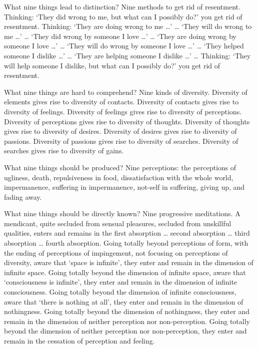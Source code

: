 \documentclass[12pt,openany]{book}%
\begin{document}
What nine things lead to distinction? Nine methods to get rid of resentment. Thinking: ‘They did wrong to me, but what can I possibly do?’ you get rid of resentment. Thinking: ‘They are doing wrong to me …’ … ‘They will do wrong to me …’ … ‘They did wrong by someone I love …’ … ‘They are doing wrong by someone I love …’ … ‘They will do wrong by someone I love …’ … ‘They helped someone I dislike …’ … ‘They are helping someone I dislike …’ … Thinking: ‘They will help someone I dislike, but what can I possibly do?’ you get rid of resentment. 

What nine things are hard to comprehend? Nine kinds of diversity. Diversity of elements gives rise to diversity of contacts. Diversity of contacts gives rise to diversity of feelings. Diversity of feelings gives rise to diversity of perceptions. Diversity of perceptions gives rise to diversity of thoughts. Diversity of thoughts gives rise to diversity of desires. Diversity of desires gives rise to diversity of passions. Diversity of passions gives rise to diversity of searches. Diversity of searches gives rise to diversity of gains. 

What nine things should be produced? Nine perceptions: the perceptions of ugliness, death, repulsiveness in food, dissatisfaction with the whole world, impermanence, suffering in impermanence, not-self in suffering, giving up, and fading away. 

What nine things should be directly known? Nine progressive meditations. A mendicant, quite secluded from sensual pleasures, secluded from unskillful qualities, enters and remains in the first absorption … second absorption … third absorption … fourth absorption. Going totally beyond perceptions of form, with the ending of perceptions of impingement, not focusing on perceptions of diversity, aware that ‘space is infinite’, they enter and remain in the dimension of infinite space. Going totally beyond the dimension of infinite space, aware that ‘consciousness is infinite’, they enter and remain in the dimension of infinite consciousness. Going totally beyond the dimension of infinite consciousness, aware that ‘there is nothing at all’, they enter and remain in the dimension of nothingness. Going totally beyond the dimension of nothingness, they enter and remain in the dimension of neither perception nor non-perception. Going totally beyond the dimension of neither perception nor non-perception, they enter and remain in the cessation of perception and feeling. 
\end{document}
